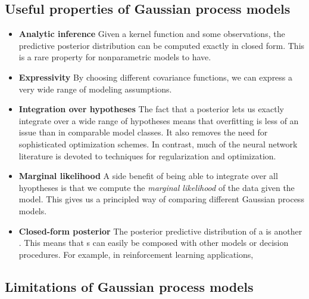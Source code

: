 \subsection{Useful properties of Gaussian process models}

\begin{itemize}

\item {\bf Analytic inference}
Given a kernel function and some observations, the predictive posterior distribution can be computed exactly in closed form.  This is a rare property for nonparametric models to have.

\item {\bf Expressivity}
By choosing different covariance functions, we can express a very wide range of modeling assumptions.

\item {\bf Integration over hypotheses}
The fact that a \gp{} posterior lets us exactly integrate over a wide range of hypotheses means that overfitting is less of an issue than in comparable model classes.
It also removes the need for sophisticated optimization schemes.
%
In contrast, much of the neural network literature is devoted to techniques for regularization and optimization.

\item {\bf Marginal likelihood}
A side benefit of being able to integrate over all hyoptheses is that we compute the \emph{marginal likelihood} of the data given the model.
This gives us a principled way of comparing different Gaussian process models.

\item {\bf Closed-form posterior}
The posterior predictive distribution of a \gp{} is another \gp{}.
This means that \gp{}s can easily be composed with other models or decision procedures.
For example, in reinforcement learning applications, 

\end{itemize}




\subsection{Limitations of Gaussian process models}

